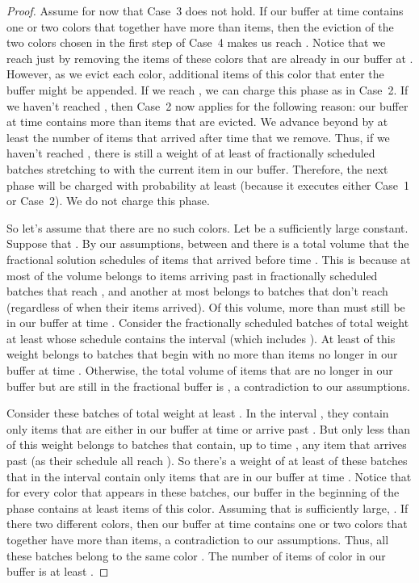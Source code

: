 \documentclass[12pt]{article}
\begin{document}
\begin{proof}
Assume for now that Case~3 does not hold. If our buffer at 
time  contains one or two colors that together have more
than  items, then the eviction of the two colors chosen 
in the first step of Case~4 makes us reach . Notice that we
reach  just by removing the items of these colors that are
already in our buffer at . However, as we evict each
color, additional items of this color that enter the buffer might 
be appended. If we reach ,
we can charge this phase as in Case~2. If we haven't reached 
, then Case~2 now applies for the following reason: our 
buffer at time  contains more than  items that are 
evicted. We advance beyond  by at least the number of items
that arrived after time  that we remove. Thus, if we haven't 
reached , there is still a weight of at least  of 
fractionally scheduled batches stretching to  with the current
item in our buffer. Therefore, the next phase will be charged with
probability at least  (because it executes either Case~1
or Case~2). We do not charge this phase.

So let's assume that there are no such colors. Let 
be a sufficiently large constant. Suppose that
. By our assumptions, between
 and  there is a total volume 
 that the fractional solution
schedules of items that arrived before time . This is
because at most  of the volume 
belongs to items arriving past  in fractionally scheduled
batches that reach , and another at most 
belongs to batches that don't reach 
(regardless of when their items arrived). Of this volume, more 
than  must still be in 
our buffer at time . Consider the fractionally scheduled
batches of total weight 
at least  whose schedule contains the interval
 (which includes ). At least
 of this weight belongs to batches that 
begin with no more than  items no longer in 
our buffer at time . Otherwise, the total volume of items
that are no longer in our buffer but are still in the fractional
buffer is 
,
a contradiction to our assumptions.

Consider these
batches of total weight at least . In the
interval , they contain only items
that are either in our buffer at time  or arrive past .
But only less than  of this weight belongs to batches
that contain, up to time , any item that arrives past 
(as their schedule all reach ). So there's a weight of at least
 of these batches that in the interval
 contain only items that are in our
buffer at time . Notice that for every color that appears
in these batches, our buffer in the beginning of the phase
contains at least  items of this
color. Assuming that  is sufficiently
large, . 
If there two different colors, then our buffer at 
time  contains one or two colors that together have more
than  items, a contradiction to our assumptions.
Thus, all these batches belong to the same color . The number
of items of color  in our buffer is at least 
. 


\end{proof}
\end{document}
